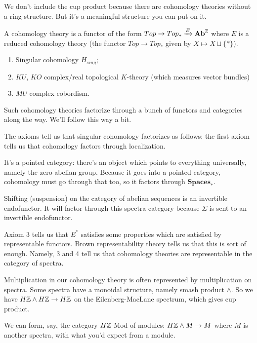 \documentclass[class=report, crop=false,a4paper,twoside]{standalone}
\begin{document}
We don't include the cup product because there are cohomology theories without a ring structure. But it's a meaningful structure you can put on it. 

\begin{definition}
	A cohomology theory is a functor of the form $Top \to Top_* \xrightarrow{E} \mathbf{Ab}^{\mathbb{Z}}$ where $E$ is a reduced cohomology theory (the functor $Top \to Top_*$ given by $X \mapsto X \sqcup \{*\}$). 
\end{definition}

\begin{example}
	\begin{enumerate}
		\item Singular cohomology $H_{sing}$;
		\item $KU$, $KO$ complex/real topological $K$-theory (which measures vector bundles)
		\item $MU$ complex cobordism.
	\end{enumerate}
\end{example}

Such cohomology theories factorize through a bunch of functors and categories along the way. We'll follow this way a bit.

The axioms tell us that singular cohomology factorizes as follows: the first axiom tells us that cohomology factors through localization. 

It's a pointed category: there's an object which points to everything universally, namely the zero abelian group. Because it goes into a pointed category, cohomology must go through that too, so it factors through $\mathbf{Spaces}_*$. 

Shifting (suspension) on the category of abelian sequences is an invertible endofunctor. It will factor through this spectra category because $\Sigma$ is sent to an invertible endofunctor. 

Axiom 3 tells us that $E^*$ satisfies some properties which are satisfied by representable functors. Brown representability theory tells us that this is sort of enough. Namely, 3 and 4 tell us that cohomology theories are representable in the category of spectra.

Multiplication in our cohomology theory is often represented by multiplication on spectra. Some spectra have a monoidal structure, namely smash product $\wedge$. So we have $H\mathbb{Z} \wedge H\mathbb{Z} \to H\mathbb{Z}$ on the Eilenberg-MacLane spectrum, which gives cup product.

We can form, say, the category $H\mathbb{Z}$-Mod of modules: $H\mathbb{Z} \wedge M \to M$ where $M$ is another spectra, with what you'd expect from a module.
\begin{center}
\end{center}
\end{document}
